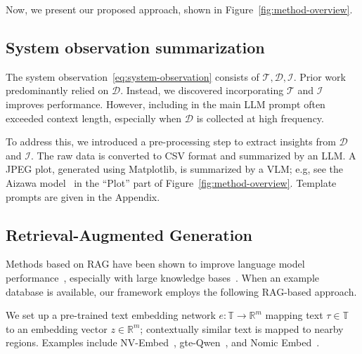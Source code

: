 \documentclass{article}
\begin{document}
Now, we present our proposed approach, shown in Figure~\ref{fig:method-overview}. 

\subsection{System observation summarization}\label{sec:summarization}

The system observation~\eqref{eq:system-observation} consists of $\mathcal{T},\mathcal{D},\mathcal{I}$.
Prior work predominantly relied on $\mathcal{D}$.
Instead, we discovered incorporating $\mathcal{T}$ and $\mathcal{I}$ improves performance. 
However, including in the main LLM prompt often exceeded context length, especially when $\mathcal{D}$ is collected at high frequency.


To address this, we introduced a pre-processing step to extract insights from $\mathcal{D}$ and $\mathcal{I}$. 
The raw data is converted to CSV format and summarized by an LLM. 
A JPEG plot, generated using Matplotlib, is summarized by a VLM; e.g, see the Aizawa model~\cite{aizawa1982} in the ``Plot'' part of Figure~\ref{fig:method-overview}. 
Template prompts are given in the Appendix.

\subsection{Retrieval-Augmented Generation}\label{sec:rag}

Methods based on RAG have been shown to improve language model performance~\cite{NEURIPS2020_6b493230}, especially with large knowledge bases~\cite{gao2024}. 
When an example database is available, our framework employs the following RAG-based approach.

We set up a pre-trained text embedding network $e: \mathbb{T} \rightarrow \mathbb{R}^m$ mapping text $\tau \in \mathbb{T}$ to an embedding vector $z \in \mathbb{R}^m$; 
contextually similar text is mapped to nearby regions.
Examples include 
NV-Embed~\cite{lee2024nv}, gte-Qwen~\cite{li2023towards}, and Nomic Embed~\cite{nussbaum2024nomicembedtrainingreproducible}. 
\end{document}
